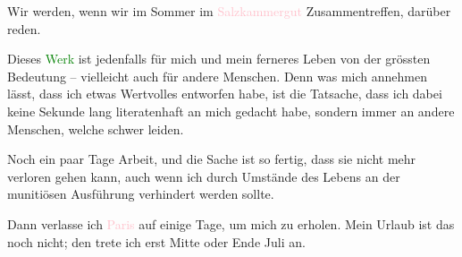 \pstart
           Wir werden, wenn wir im Sommer im \textcolor{pink}{Salzkammergut}\ledrightnote{\textcolor{pink}{Salzkammergut}}
               Zusammentreffen, darüber reden.\pend
           
\pstart
           Dieses \textcolor{green}{Werk}\ledrightnote{{$\rightarrow$}\emph{\textcolor{green}{Der Judenstaat. Versuch einer modernen Lösung der Judenfrage}}} ist jedenfalls für mich und
               mein ferneres Leben von der grössten Bedeutung – vielleicht auch für andere Menschen.
               Denn was mich annehmen lässt, dass ich etwas Wertvolles entworfen habe, ist die
               Tatsache, dass ich dabei keine Sekunde lang literatenhaft an mich gedacht habe,
               sondern immer an andere Menschen, welche schwer leiden.\pend
           
\pstart
           Noch ein paar Tage Arbeit, und die Sache ist so fertig, dass sie nicht mehr verloren
               gehen kann, auch wenn ich durch Umstände des Lebens an der munitiösen Ausführung
               verhindert werden sollte.\pend
           
\pstart
           Dann verlasse ich \textcolor{pink}{Paris}\ledrightnote{\textcolor{pink}{Paris}} auf einige Tage, um mich
               zu erholen. Mein Urlaub ist das noch nicht; den trete ich erst Mitte oder Ende Juli
               an.\pend
           
